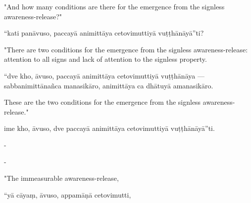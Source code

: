 \begin{samepage}
\begin{leftcolumn*}
"And how many conditions are there for the emergence from the signless awareness-release?"
\end{leftcolumn*}

\begin{rightcolumn}
“kati panāvuso, paccayā animittāya cetovimuttiyā vuṭṭhānāyā”ti?
\end{rightcolumn}
\end{samepage}

\begin{samepage}
\begin{leftcolumn*}
"There are two conditions for the emergence from the signless awareness-release: attention to all signs and lack of attention to the signless property.
\end{leftcolumn*}

\begin{rightcolumn}
“dve kho, āvuso, paccayā animittāya cetovimuttiyā vuṭṭhānāya — sabbanimittānañca manasikāro, animittāya ca dhātuyā amanasikāro.
\end{rightcolumn}
\end{samepage}

\begin{samepage}
\begin{leftcolumn*}
These are the two conditions for the emergence from the signless awareness-release."
\end{leftcolumn*}

\begin{rightcolumn}
ime kho, āvuso, dve paccayā animittāya cetovimuttiyā vuṭṭhānāyā”ti.
\end{rightcolumn}
\end{samepage}

\begin{samepage}
\begin{leftcolumn*}
-
\end{leftcolumn*}

\begin{rightcolumn}
-
\end{rightcolumn}
\end{samepage}

\begin{samepage}
\begin{leftcolumn*}
"The immeasurable awareness-release,
\end{leftcolumn*}

\begin{rightcolumn}
“yā cāyaṃ, āvuso, appamāṇā cetovimutti,
\end{rightcolumn}
\end{samepage}

